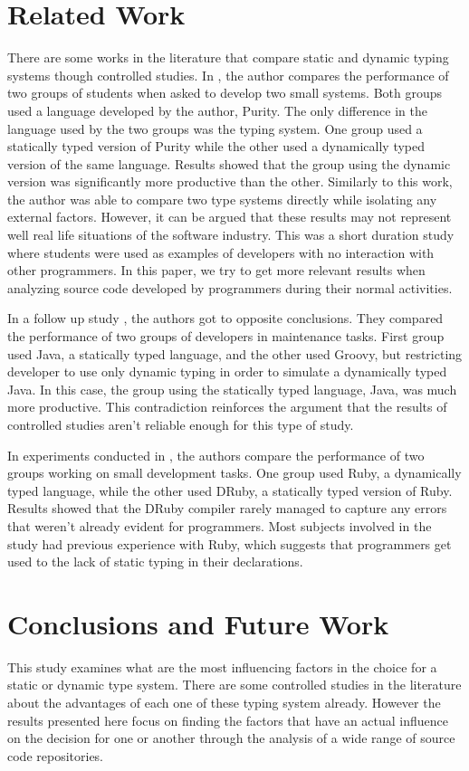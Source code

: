 \documentclass[preprint]{sigplanconf}
\begin{document}
\section{Related Work\label{sec:Trabalhos-Relacionados}}
There are some works in the literature that compare static and dynamic typing systems though controlled studies.
In \cite{experiment_with_purity}, the author compares the performance of two groups of students when asked to develop two small systems. 
Both groups used a language developed by the author, Purity. 
The only difference in the language used by the two groups was the typing system.
One group used a statically typed version of Purity while the other used a dynamically typed version of the same language.
Results showed that the group using the dynamic version was significantly more productive than the other. 
Similarly to this work, the author was able to compare two type systems directly while isolating any external factors. 
However, it can be argued that these results may not represent well real life situations of the software industry. 
This was a short duration study where students were used as examples of developers with no interaction with other programmers. 
In this paper, we try to get more relevant results when analyzing source code developed by programmers during their normal activities.

In a follow up study \cite{hanenberg_icpc}, the authors got to opposite conclusions. 
They compared the performance of two groups of developers in maintenance tasks. 
First group used Java, a statically typed language, and the other used Groovy, but restricting developer to use only dynamic typing in order to simulate a dynamically typed Java.
In this case, the group using the statically typed language, Java, was much more productive.
This contradiction reinforces the argument that the results of controlled studies aren't reliable enough for this type of study.

In experiments conducted in \cite{ruby_vs_druby}, the authors compare the performance of two groups working on small development tasks.
One group used Ruby, a dynamically typed language, while the other used DRuby, a statically typed version of Ruby. 
Results showed that the DRuby compiler rarely managed to capture any errors that weren't already evident for programmers.
Most subjects involved in the study had previous experience with Ruby, which suggests that programmers get used to the lack of static typing in their declarations.

\section{Conclusions and Future Work\label{sec:Conclus=0000E3o-e-Trabalhos}}
This study examines what are the most influencing factors in the choice for a static or dynamic type system. 
There are some controlled studies in the literature about the advantages of each one of these typing system already. 
However the results presented here focus on finding the factors that have an actual influence on the decision for one or another through the analysis of a wide range of source code repositories.
\end{document}
